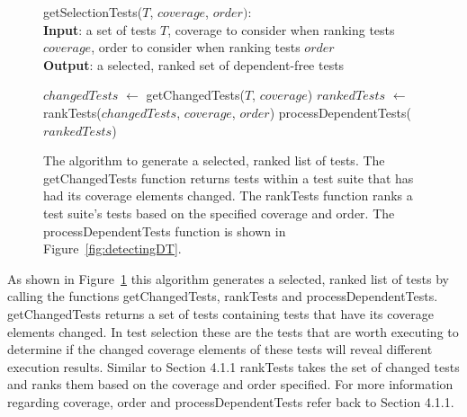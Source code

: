 \begin{figure}[t]
	getSelectionTests($\mathit{T}$, $\mathit{coverage}$, $\mathit{order}):$\\
	\textbf{Input}: a set of tests $\mathit{T}$, coverage to consider when ranking tests $\mathit{coverage}$, order to consider when ranking tests $\mathit{order}$\\
	\textbf{Output}: a selected, ranked set of dependent-free tests\\
	 \begin{algorithmic}[1]
	 	\vspace{-5mm}
	 	\STATE $\mathit{changedTests}$ $\leftarrow$ getChangedTests($\mathit{T}$, $\mathit{coverage}$)
		\STATE $\mathit{rankedTests}$ $\leftarrow$ rankTests($\mathit{changedTests}$, $\mathit{coverage}$, $\mathit{order}$)
		\RETURN processDependentTests($\mathit{rankedTests}$)
	\end{algorithmic}
	\vspace{-3mm}
	\caption {
		The algorithm to generate a selected, ranked list of tests. The getChangedTests function returns tests within a test suite that has had its coverage elements changed. The rankTests function ranks a test suite's tests based on the specified coverage and order. The processDependentTests function is shown in Figure~\ref{fig:detectingDT}.
	}
	\label{fig:selection}
\end{figure}
As shown in Figure~\ref{fig:selection} this algorithm generates a selected, ranked list of tests by calling the functions getChangedTests, rankTests and processDependentTests. getChangedTests returns a set of tests containing tests that have its coverage elements changed. In test selection these are the tests that are worth executing to determine if the changed coverage elements of these tests will reveal different execution results. Similar to Section 4.1.1 rankTests takes the set of changed tests and ranks them based on the coverage and order specified. For more information regarding coverage, order and processDependentTests refer back to Section 4.1.1.

